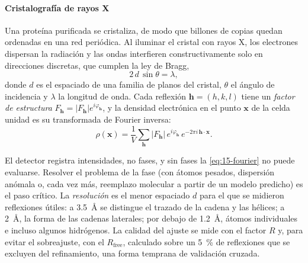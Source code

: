 \paragraph{Cristalografía de rayos X} Una proteína purificada se cristaliza, de modo que billones de copias quedan ordenadas en una red periódica. Al iluminar el cristal con rayos X, los electrones dispersan la radiación y las ondas interfieren constructivamente solo en direcciones discretas, que cumplen la ley de Bragg,
\begin{equation}\label{eq:15-bragg}
2\,d\,\sin\theta = \lambda,
\end{equation}
donde $d$ es el espaciado de una familia de planos del cristal, $\theta$ el ángulo de incidencia y $\lambda$ la longitud de onda. Cada reflexión $\mathbf h=(h,k,l)$ tiene un \emph{factor de estructura} $F_{\mathbf h}=|F_{\mathbf h}|e^{i\varphi_{\mathbf h}}$, y la densidad electrónica en el punto $\mathbf x$ de la celda unidad es su transformada de Fourier inversa:
\begin{equation}\label{eq:15-fourier}
\rho(\mathbf x) = \frac{1}{V}\sum_{\mathbf h} |F_{\mathbf h}|\,e^{i\varphi_{\mathbf h}}\,e^{-2\pi i\,\mathbf h\cdot\mathbf x}.
\end{equation}

\begin{simbolos}
\end{simbolos}

El detector registra intensidades, no fases, y sin fases la \cref{eq:15-fourier} no puede evaluarse. Resolver el problema de la fase (con átomos pesados, dispersión anómala o, cada vez más, reemplazo molecular a partir de un modelo predicho) es el paso crítico. La \emph{resolución} es el menor espaciado $d$ para el que se midieron reflexiones útiles: a \SI{3,5}{\angstrom} se distingue el trazado de la cadena y las hélices; a \SI{2}{\angstrom}, la forma de las cadenas laterales; por debajo de \SI{1,2}{\angstrom}, átomos individuales e incluso algunos hidrógenos. La calidad del ajuste se mide con el factor $R$ y, para evitar el sobreajuste, con el $R_{\text{free}}$, calculado sobre un \SI{5}{\percent} de reflexiones que se excluyen del refinamiento, una forma temprana de validación cruzada.

